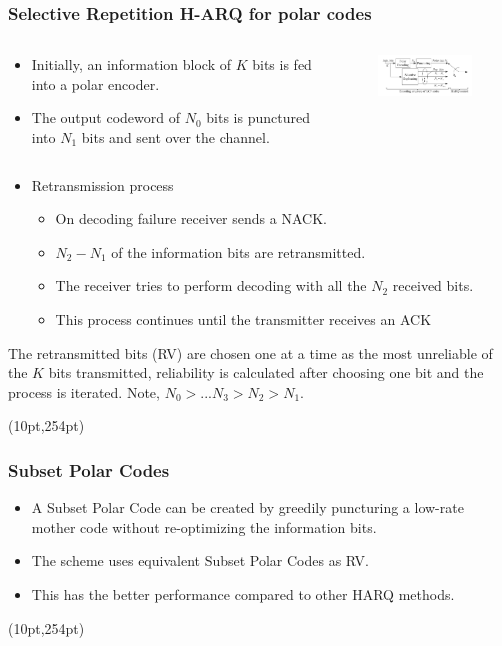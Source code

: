 \documentclass[xcolor=dvipsnames]{beamer}
\newcommand\hyperback[1]{%
  \begin{textblock*}{\paperwidth}(10pt,254pt)
    \raggedright #1\hspace{.5em}
  \end{textblock*}}
\begin{document}
\begin{frame}[label = selrep]
\frametitle{Selective Repetition H-ARQ for polar codes}
\begin{columns}
\begin{column}{0.4\textwidth}
\begin{itemize}
\item Initially, an information block of $K$ bits is fed into a polar encoder.
\item The output codeword of $N_0$ bits is punctured into $N_1$
bits and sent over the channel.
\end{itemize}
\end{column}
\begin{column}{0.5\textwidth}
\begin{figure}
\includegraphics[width=6cm]{./selrepharq.png}
\end{figure}
\end{column}
\end{columns}
\begin{itemize}
\item {Retransmission process}
\begin{itemize}
\item On decoding failure receiver sends a NACK.
\item $N_2-N_1$ of the information bits are retransmitted. 
\item The receiver tries to perform decoding with all the $N_2$ received
bits.
\item This process continues until the transmitter
receives an ACK 
\end{itemize}
\end{itemize}
\vspace{.5cm}
\tiny The retransmitted bits (RV) are chosen one at a time as the most unreliable of the $K$ bits transmitted, reliability is calculated after choosing one bit and the process is iterated. Note, $N_0>...N_3>N_2>N_1$.
\hyperback{\hyperlink{HARQp}{}}
\end{frame}
\begin{frame}[label = subpol]
\frametitle{Subset Polar Codes}
\begin{itemize}
\item A Subset Polar Code can be created by greedily puncturing a low-rate mother code without re-optimizing the information bits.
\item The scheme uses equivalent Subset Polar Codes as RV.
\item This has the better performance compared to other HARQ methods.
\end{itemize}
\hyperback{\hyperlink{HARQp}{}}
\end{frame}
\end{document}
